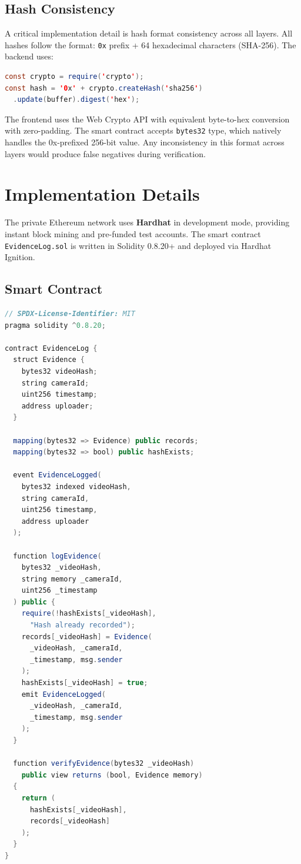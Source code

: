 \documentclass[conference]{IEEEtran}
\begin{document}
\subsection{Hash Consistency}

A critical implementation detail is hash format consistency across all layers. All hashes follow the format: \texttt{0x} prefix + 64 hexadecimal characters (SHA-256). The backend uses:

\begin{lstlisting}[language=Java,caption={Hash computation in Node.js backend}]
const crypto = require('crypto');
const hash = '0x' + crypto.createHash('sha256')
  .update(buffer).digest('hex');
\end{lstlisting}

The frontend uses the Web Crypto API with equivalent byte-to-hex conversion with zero-padding. The smart contract accepts \texttt{bytes32} type, which natively handles the 0x-prefixed 256-bit value. Any inconsistency in this format across layers would produce false negatives during verification.

\section{Implementation Details}

The private Ethereum network uses \textbf{Hardhat} in development mode, providing instant block mining and pre-funded test accounts. The smart contract \texttt{EvidenceLog.sol} is written in Solidity 0.8.20+ and deployed via Hardhat Ignition.

\subsection{Smart Contract}

\begin{lstlisting}[language=Java,caption={EvidenceLog.sol smart contract (simplified)}]
// SPDX-License-Identifier: MIT
pragma solidity ^0.8.20;

contract EvidenceLog {
  struct Evidence {
    bytes32 videoHash;
    string cameraId;
    uint256 timestamp;
    address uploader;
  }

  mapping(bytes32 => Evidence) public records;
  mapping(bytes32 => bool) public hashExists;

  event EvidenceLogged(
    bytes32 indexed videoHash,
    string cameraId,
    uint256 timestamp,
    address uploader
  );

  function logEvidence(
    bytes32 _videoHash,
    string memory _cameraId,
    uint256 _timestamp
  ) public {
    require(!hashExists[_videoHash],
      "Hash already recorded");
    records[_videoHash] = Evidence(
      _videoHash, _cameraId,
      _timestamp, msg.sender
    );
    hashExists[_videoHash] = true;
    emit EvidenceLogged(
      _videoHash, _cameraId,
      _timestamp, msg.sender
    );
  }

  function verifyEvidence(bytes32 _videoHash)
    public view returns (bool, Evidence memory)
  {
    return (
      hashExists[_videoHash],
      records[_videoHash]
    );
  }
}
\end{lstlisting}
\end{document}
